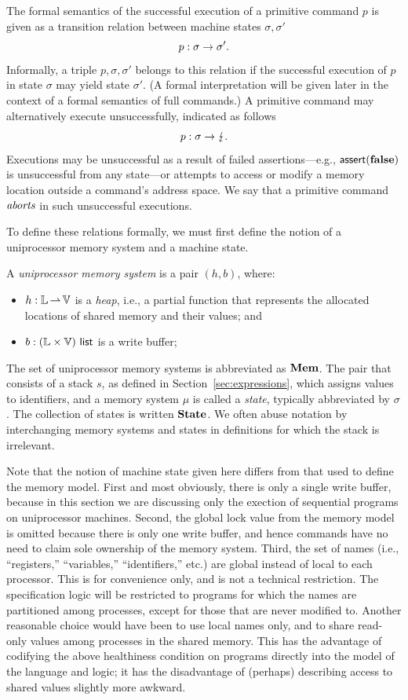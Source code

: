 \documentclass[11pt]{report}
\begin{document}
The formal semantics of the successful execution of a primitive command $p$ is given as a transition relation between machine states $\sigma,\sigma'$ \[ p : \sigma \rightarrow \sigma'. \] Informally, a triple $p,\sigma,\sigma'$ belongs to this relation if the successful execution of $p$ in state $\sigma$ may yield state $\sigma'$. (A formal interpretation will be given later in the context of a formal semantics of full commands.) A primitive command may alternatively execute unsuccessfully, indicated as follows \[ p : \sigma \rightarrow \lightning. \] Executions may be unsuccessful as a result of failed assertions---e.g., $\operatorname{\mathsf{assert}}(\mathbf{false})$ is unsuccessful from any state---or attempts to access or modify a memory location outside a command's address space. We say that a primitive command $\emph{aborts}$ in such unsuccessful executions. 

To define these relations formally, we must first define the notion of a uniprocessor memory system and a machine state. 

\begin{definition}
A \emph{uniprocessor memory system} is a pair $(h,b)$, where: \begin{itemize}
    \item $h : \mathbb{L} \operatorname{\rightharpoonup} \mathbb{V}$ is a \emph{heap}, i.e., a partial function that represents the allocated locations of shared memory and their values; and 
    \item $b : (\mathbb{L} \times \mathbb{V})~\mathsf{list}$ is a write buffer;
\end{itemize}
\end{definition} 
The set of uniprocessor memory systems is abbreviated as $\mathbf{Mem}$.
The pair that consists of a stack $s$, as defined in Section~\ref{sec:expressions}, which assigns values to identifiers, and a memory system $\mu$ is called a \emph{state}, typically abbreviated by $\sigma$. The collection of states is written $\mathbf{State}$. We often abuse notation by interchanging memory systems and states in definitions for which the stack is irrelevant. 

Note that the notion of machine state given here differs from that used to define the memory model. First and most obviously, there is only a single write buffer, because in this section we are discussing only the exection of sequential programs on uniprocessor machines. Second, the global lock value from the memory model is omitted because there is only one write buffer, and hence commands have no need to claim sole ownership of the memory system. Third, the set of names (i.e., ``registers,'' ``variables,'' ``identifiers,'' etc.) are global instead of local to each processor. This is for convenience only, and is not a technical restriction. The specification logic will be restricted to programs for which the names are partitioned among processes, except for those that are never modified to. Another reasonable choice would have been to use local names only, and to share read-only values among processes in the shared memory. This has the advantage of codifying the above healthiness condition on programs directly into the model of the language and logic; it has the disadvantage of (perhaps) describing access to shared values slightly more awkward. 
\end{document}
